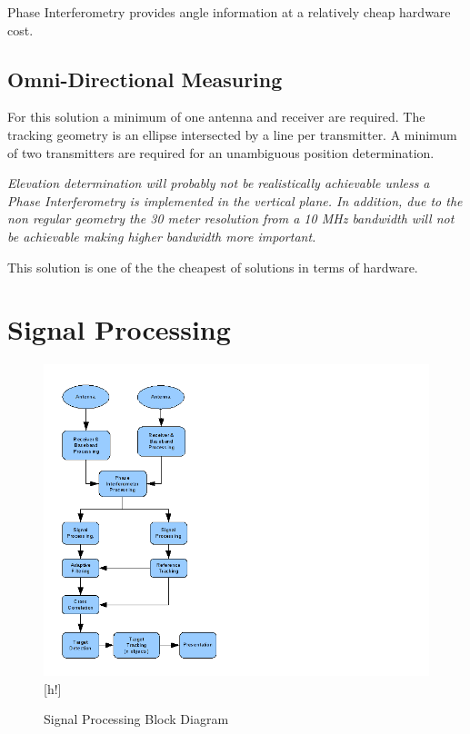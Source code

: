 \documentclass[a4paper]{report}
\newcommand\textstyleEmphasis[1]{\textit{#1}}
\numberwithin{equation}{chapter}
\begin{document}
\bigskip

Phase Interferometry provides angle information at a relatively cheap hardware cost.

\section[Omni-Direction Measuring]{Omni-Directional Measuring}
For this solution a minimum of one antenna
and receiver are required. 
The tracking geometry is an ellipse intersected by a line 
per transmitter. A minimum of two transmitters are required
for an unambiguous position determination.

\bigskip

\textstyleEmphasis{\textup{Elevation determination will probably not be
realistically achievable unless a Phase Interferometry is implemented
in the vertical plane. In addition, due to the non regular geometry the
30 meter resolution from a 10 MHz bandwidth will not be achievable
making higher bandwidth more important.}}

\bigskip

This solution is one of the the cheapest of solutions in terms of hardware.

\clearpage\setcounter{page}{1}
\chapter[Signal Processing]{Signal Processing}

\begin{figure}
\centering 
\includegraphics{Passive-Weather-Radar-Theory-fig-03.png}[h!]
\caption[Signal Processing Block Diagram]{Signal Processing Block Diagram}
\label{fig:03}
\end{figure}
\end{document}
